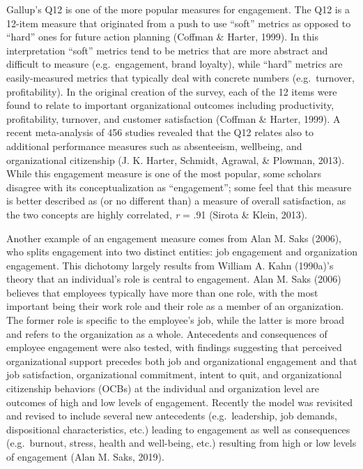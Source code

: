 \documentclass[
  man]{apa6}
\begin{document}
Gallup's Q12 is one of the more popular measures for engagement. The Q12 is a 12-item measure that originated from a push to use ``soft'' metrics as opposed to ``hard'' ones for future action planning (Coffman \& Harter, 1999). In this interpretation ``soft'' metrics tend to be metrics that are more abstract and difficult to measure (e.g.~engagement, brand loyalty), while ``hard'' metrics are easily-measured metrics that typically deal with concrete numbers (e.g.~turnover, profitability). In the original creation of the survey, each of the 12 items were found to relate to important organizational outcomes including productivity, profitability, turnover, and customer satisfaction (Coffman \& Harter, 1999). A recent meta-analysis of 456 studies revealed that the Q12 relates also to additional performance measures such as absenteeism, wellbeing, and organizational citizenship (J. K. Harter, Schmidt, Agrawal, \& Plowman, 2013). While this engagement measure is one of the most popular, some scholars disagree with its conceptualization as ``engagement''; some feel that this measure is better described as (or no different than) a measure of overall satisfaction, as the two concepts are highly correlated, \emph{r} = .91 (Sirota \& Klein, 2013).

Another example of an engagement measure comes from Alan M. Saks (2006), who splits engagement into two distinct entities: job engagement and organization engagement. This dichotomy largely results from William A. Kahn (1990a)'s theory that an individual's role is central to engagement. Alan M. Saks (2006) believes that employees typically have more than one role, with the most important being their work role and their role as a member of an organization. The former role is specific to the employee's job, while the latter is more broad and refers to the organization as a whole. Antecedents and consequences of employee engagement were also tested, with findings suggesting that perceived organizational support precedes both job and organizational engagement and that job satisfaction, organizational commitment, intent to quit, and organizational citizenship behaviors (OCBs) at the individual and organization level are outcomes of high and low levels of engagement. Recently the model was revisited and revised to include several new antecedents (e.g.~leadership, job demands, dispositional characteristics, etc.) leading to engagement as well as consequences (e.g.~burnout, stress, health and well-being, etc.) resulting from high or low levels of engagement (Alan M. Saks, 2019).
\end{document}
